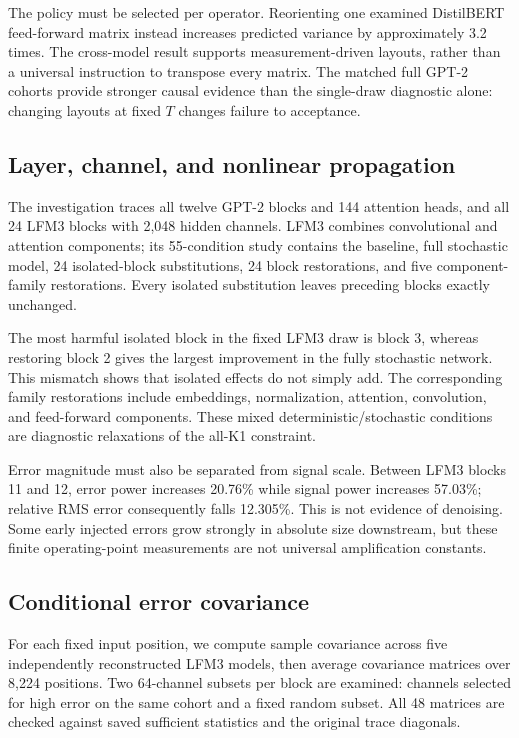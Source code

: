 \documentclass[11pt]{article}
\begin{document}
The policy must be selected per operator. Reorienting one examined DistilBERT feed-forward matrix instead increases predicted variance by approximately 3.2 times. The cross-model result supports measurement-driven layouts, rather than a universal instruction to transpose every matrix. The matched full GPT-2 cohorts provide stronger causal evidence than the single-draw diagnostic alone: changing layouts at fixed $T$ changes failure to acceptance.

\subsection{Layer, channel, and nonlinear propagation}
The investigation traces all twelve GPT-2 blocks and 144 attention heads, and all 24 LFM3 blocks with 2,048 hidden channels. LFM3 combines convolutional and attention components; its 55-condition study contains the baseline, full stochastic model, 24 isolated-block substitutions, 24 block restorations, and five component-family restorations. Every isolated substitution leaves preceding blocks exactly unchanged.

The most harmful isolated block in the fixed LFM3 draw is block 3, whereas restoring block 2 gives the largest improvement in the fully stochastic network. This mismatch shows that isolated effects do not simply add. The corresponding family restorations include embeddings, normalization, attention, convolution, and feed-forward components. These mixed deterministic/stochastic conditions are diagnostic relaxations of the all-K1 constraint.


Error magnitude must also be separated from signal scale. Between LFM3 blocks 11 and 12, error power increases 20.76\% while signal power increases 57.03\%; relative RMS error consequently falls 12.305\%. This is not evidence of denoising. Some early injected errors grow strongly in absolute size downstream, but these finite operating-point measurements are not universal amplification constants.

\subsection{Conditional error covariance}
For each fixed input position, we compute sample covariance across five independently reconstructed LFM3 models, then average covariance matrices over 8,224 positions. Two 64-channel subsets per block are examined: channels selected for high error on the same cohort and a fixed random subset. All 48 matrices are checked against saved sufficient statistics and the original trace diagonals.
\end{document}
